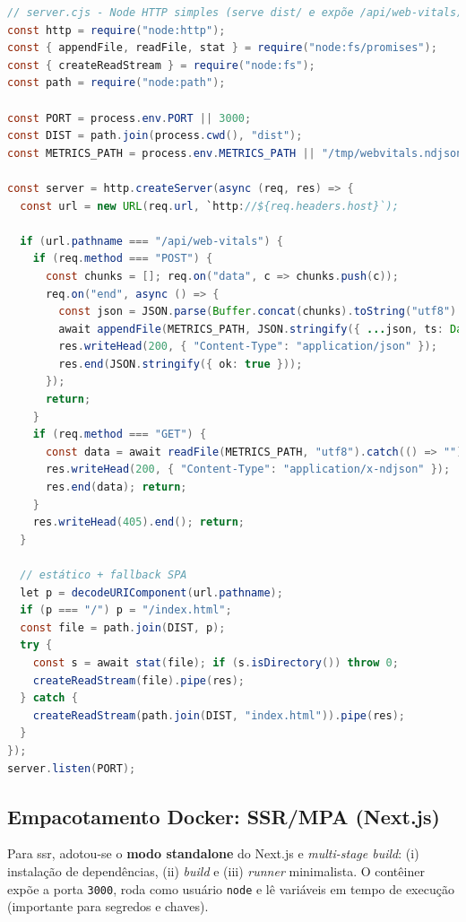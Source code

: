 \begin{lstlisting}[language=Java,caption={Servidor estático + endpoint (CSR/React+Vite)}]
// server.cjs - Node HTTP simples (serve dist/ e expõe /api/web-vitals)
const http = require("node:http");
const { appendFile, readFile, stat } = require("node:fs/promises");
const { createReadStream } = require("node:fs");
const path = require("node:path");

const PORT = process.env.PORT || 3000;
const DIST = path.join(process.cwd(), "dist");
const METRICS_PATH = process.env.METRICS_PATH || "/tmp/webvitals.ndjson";

const server = http.createServer(async (req, res) => {
  const url = new URL(req.url, `http://${req.headers.host}`);

  if (url.pathname === "/api/web-vitals") {
    if (req.method === "POST") {
      const chunks = []; req.on("data", c => chunks.push(c));
      req.on("end", async () => {
        const json = JSON.parse(Buffer.concat(chunks).toString("utf8") || "{}");
        await appendFile(METRICS_PATH, JSON.stringify({ ...json, ts: Date.now() }) + "\n", "utf8");
        res.writeHead(200, { "Content-Type": "application/json" });
        res.end(JSON.stringify({ ok: true }));
      });
      return;
    }
    if (req.method === "GET") {
      const data = await readFile(METRICS_PATH, "utf8").catch(() => "");
      res.writeHead(200, { "Content-Type": "application/x-ndjson" });
      res.end(data); return;
    }
    res.writeHead(405).end(); return;
  }

  // estático + fallback SPA
  let p = decodeURIComponent(url.pathname);
  if (p === "/") p = "/index.html";
  const file = path.join(DIST, p);
  try {
    const s = await stat(file); if (s.isDirectory()) throw 0;
    createReadStream(file).pipe(res);
  } catch {
    createReadStream(path.join(DIST, "index.html")).pipe(res);
  }
});
server.listen(PORT);
\end{lstlisting}

\subsection{Empacotamento Docker: SSR/MPA (Next.js)}
\label{ssec:ssr-docker}

Para \acrshort{ssr}, adotou-se o \textbf{modo standalone} do Next.js e \textit{multi-stage build}: (i) instalação de dependências, (ii) \textit{build} e (iii) \textit{runner} minimalista. O contêiner expõe a porta \texttt{3000}, roda como usuário \texttt{node} e lê variáveis em tempo de execução (importante para segredos e chaves).

